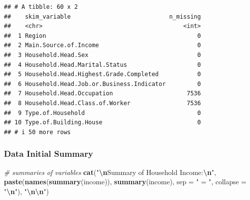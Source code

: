 \documentclass[
]{article}
\newenvironment{Shaded}{\begin{snugshade}}{\end{snugshade}}
\newcommand{\AttributeTok}[1]{\textcolor[rgb]{0.13,0.29,0.53}{#1}}
\newcommand{\CommentTok}[1]{\textcolor[rgb]{0.56,0.35,0.01}{\textit{#1}}}
\newcommand{\DecValTok}[1]{\textcolor[rgb]{0.00,0.00,0.81}{#1}}
\newcommand{\FloatTok}[1]{\textcolor[rgb]{0.00,0.00,0.81}{#1}}
\newcommand{\FunctionTok}[1]{\textcolor[rgb]{0.13,0.29,0.53}{\textbf{#1}}}
\newcommand{\NormalTok}[1]{#1}
\newcommand{\OtherTok}[1]{\textcolor[rgb]{0.56,0.35,0.01}{#1}}
\newcommand{\SpecialCharTok}[1]{\textcolor[rgb]{0.81,0.36,0.00}{\textbf{#1}}}
\newcommand{\StringTok}[1]{\textcolor[rgb]{0.31,0.60,0.02}{#1}}
\begin{document}
\begin{verbatim}
## # A tibble: 60 x 2
##    skim_variable                            n_missing
##    <chr>                                        <int>
##  1 Region                                           0
##  2 Main.Source.of.Income                            0
##  3 Household.Head.Sex                               0
##  4 Household.Head.Marital.Status                    0
##  5 Household.Head.Highest.Grade.Completed           0
##  6 Household.Head.Job.or.Business.Indicator         0
##  7 Household.Head.Occupation                     7536
##  8 Household.Head.Class.of.Worker                7536
##  9 Type.of.Household                                0
## 10 Type.of.Building.House                           0
## # i 50 more rows
\end{verbatim}

\begin{Shaded}
\end{Shaded}

\subsubsection{Data Initial Summary}\label{data-initial-summary}

\begin{Shaded}
\begin{Highlighting}[]
\CommentTok{\# summaries of variables}
\FunctionTok{cat}\NormalTok{(}\StringTok{"}\SpecialCharTok{\textbackslash{}n}\StringTok{Summary of Household Income:}\SpecialCharTok{\textbackslash{}n}\StringTok{"}\NormalTok{, }
    \FunctionTok{paste}\NormalTok{(}\FunctionTok{names}\NormalTok{(}\FunctionTok{summary}\NormalTok{(income)), }\FunctionTok{summary}\NormalTok{(income), }\AttributeTok{sep =} \StringTok{" = "}\NormalTok{, }\AttributeTok{collapse =} \StringTok{"}\SpecialCharTok{\textbackslash{}n}\StringTok{"}\NormalTok{), }\StringTok{"}\SpecialCharTok{\textbackslash{}n\textbackslash{}n}\StringTok{"}\NormalTok{)}
\end{Highlighting}
\end{Shaded}
\end{document}
